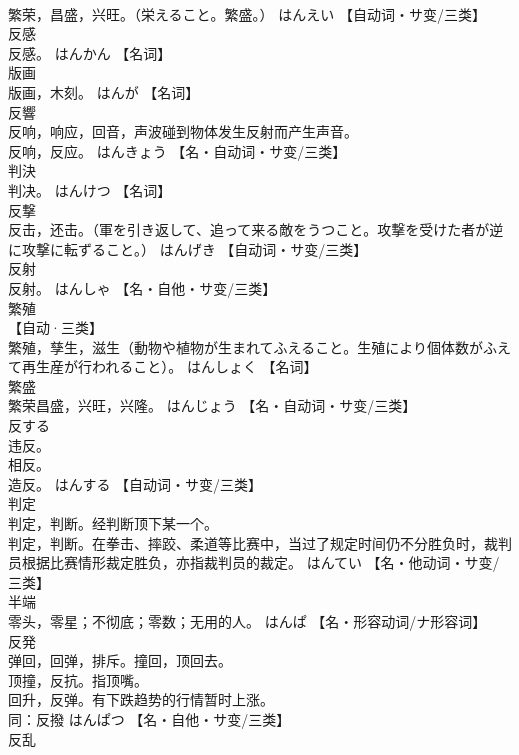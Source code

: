 \documentclass[8pt]{extreport}
\begin{document}
\begin{CJK}{UTF8}{min}
\\	繁荣，昌盛，兴旺。（栄えること。繁盛。）	はんえい		【自动词・サ变/三类】
\\	反感	
\\	反感。	はんかん		【名词】
\\	版画	
\\	版画，木刻。	はんが		【名词】
\\	反響	
\\	反响，响应，回音，声波碰到物体发生反射而产生声音。 
\\	反响，反应。	はんきょう		【名・自动词・サ变/三类】
\\	判決	
\\	判决。	はんけつ		【名词】
\\	反撃	
\\	反击，还击。（軍を引き返して、追って来る敵をうつこと。攻撃を受けた者が逆に攻撃に転ずること。）	はんげき		【自动词・サ变/三类】
\\	反射	
\\	反射。	はんしゃ		【名・自他・サ变/三类】
\\	繁殖	
\\	【自动·三类】 
\\	繁殖，孳生，滋生（動物や植物が生まれてふえること。生殖により個体数がふえて再生産が行われること）。	はんしょく		【名词】
\\	繁盛	
\\	繁荣昌盛，兴旺，兴隆。	はんじょう		【名・自动词・サ变/三类】
\\	反する	
\\	违反。 
\\	相反。 
\\	造反。	はんする		【自动词・サ变/三类】
\\	判定	
\\	判定，判断。经判断顶下某一个。 
\\	判定，判断。在拳击、摔跤、柔道等比赛中，当过了规定时间仍不分胜负时，裁判员根据比赛情形裁定胜负，亦指裁判员的裁定。	はんてい		【名・他动词・サ变/三类】
\\	半端	
\\	零头，零星；不彻底；零数；无用的人。	はんぱ		【名・形容动词/ナ形容词】
\\	反発	
\\	弹回，回弹，排斥。撞回，顶回去。 
\\	顶撞，反抗。指顶嘴。 
\\	回升，反弹。有下跌趋势的行情暂时上涨。 
\\	同：反撥	はんぱつ		【名・自他・サ变/三类】
\\	反乱	

\end{CJK}
\end{document}
